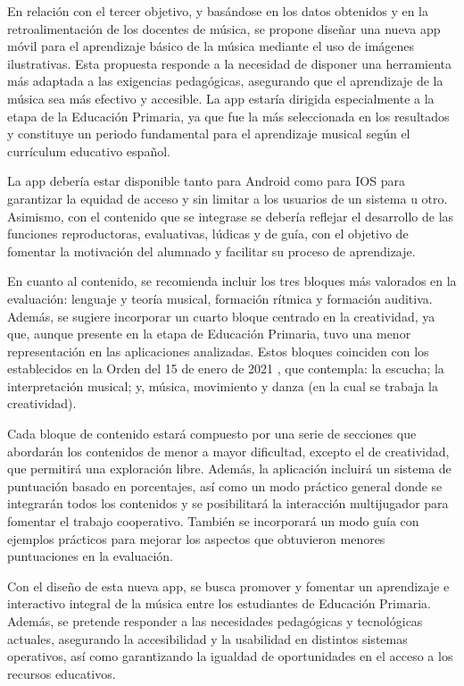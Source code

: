 \documentclass[spanish]{textolivre}
\begin{document}
En relación con el tercer objetivo, y basándose en los datos obtenidos y en la retroalimentación de los docentes de música, se propone diseñar una nueva app móvil para el aprendizaje básico de la música mediante el uso de imágenes ilustrativas. Esta propuesta responde a la necesidad de disponer una herramienta más adaptada a las exigencias pedagógicas, asegurando que el aprendizaje de la música sea más efectivo y accesible. La app estaría dirigida especialmente a la etapa de la Educación Primaria, ya que fue la más seleccionada en los resultados y constituye un periodo fundamental para el aprendizaje musical según el currículum educativo español. 

La app debería estar disponible tanto para Android como para IOS para garantizar la equidad de acceso y sin limitar a los usuarios de un sistema u otro. Asimismo, con el contenido que se integrase se debería reflejar el desarrollo de las funciones reproductoras, evaluativas, lúdicas y de guía, con el objetivo de fomentar la motivación del alumnado y facilitar su proceso de aprendizaje. 

En cuanto al contenido, se recomienda incluir los tres bloques más valorados en la evaluación: lenguaje y teoría musical, formación rítmica y formación auditiva. Además, se sugiere incorporar un cuarto bloque centrado en la creatividad, ya que, aunque presente en la etapa de Educación Primaria, tuvo una menor representación en las aplicaciones analizadas. Estos bloques coinciden con los establecidos en la Orden del 15 de enero de 2021 \cite{andalucia2021}, que contempla: la escucha; la interpretación musical; y, música, movimiento y danza (en la cual se trabaja la creatividad).

Cada bloque de contenido estará compuesto por una serie de secciones que abordarán los contenidos de menor a mayor dificultad, excepto el de creatividad, que permitirá una exploración libre. Además, la aplicación incluirá un sistema de puntuación basado en porcentajes, así como un modo práctico general donde se integrarán todos los contenidos y se posibilitará la interacción multijugador para fomentar el trabajo cooperativo. También se incorporará un modo guía con ejemplos prácticos para mejorar los aspectos que obtuvieron menores puntuaciones en la evaluación.

Con el diseño de esta nueva app, se busca promover y fomentar un aprendizaje e interactivo integral de la música entre los estudiantes de Educación Primaria. Además, se pretende responder a las necesidades pedagógicas y tecnológicas actuales, asegurando la accesibilidad y la usabilidad en distintos sistemas operativos, así como garantizando la igualdad de oportunidades en el acceso a los recursos educativos. 
\end{document}
